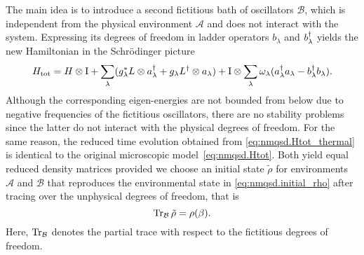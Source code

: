 The main idea is to introduce a second fictitious bath of oscillators $\mathcal{B}$, which is independent from the physical environment $\mathcal{A}$ and does not interact with the system.
Expressing its degrees of freedom in ladder operators $b_\lambda$ and $b^\dagger_\lambda$ yields the new Hamiltonian in the Schrödinger picture
\begin{equation}
  H_\mathrm{tot} = H \otimes \mathrm{I} + \sum_\lambda ({g}^*_\lambda L\otimes a^\dagger_\lambda + g_\lambda L^\dagger\otimes a_\lambda) + \mathrm{I} \otimes \sum_\lambda \omega_\lambda (a^\dagger_\lambda a_\lambda - b^\dagger_\lambda b_\lambda).
  \label{eq:nmqsd.Htot_thermal}
\end{equation}
Although the corresponding eigen-energies are not bounded from below due to negative frequencies of the fictitious oscillators, there are no stability problems since the latter do not interact with the physical degrees of freedom.
For the same reason, the reduced time evolution obtained from \autoref{eq:nmqsd.Htot_thermal} is identical to the original microscopic model~\ref{eq:nmqsd.Htot}.
Both yield equal reduced density matrices provided we choose an initial state $\tilde\rho$ for environments $\mathcal{A}$ and $\mathcal{B}$ that reproduces the environmental state in \autoref{eq:nmqsd.initial_rho} after tracing over the unphysical degrees of freedom, that is
\begin{equation}
  \operatorname{Tr}_\mathcal{B} \tilde\rho = \rho(\beta).
  \label{eq:nmqsd.rho_tilde}
\end{equation}
Here, $\operatorname{Tr}_\mathcal{B}$ denotes the partial trace with respect to the fictitious degrees of freedom.

